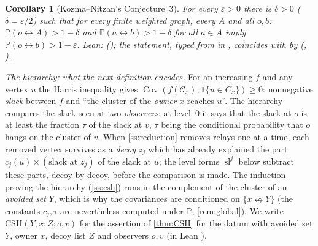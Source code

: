 \documentclass[11pt]{article}
\newtheorem{corollary}[theorem]{Corollary}
\theoremstyle{definition}
\theoremstyle{remark}
\newcommand{\PP}{\mathbb{P}}
\DeclareMathOperator{\Cov}{Cov}
\newcommand{\con}{\leftrightarrow}
\newcommand{\ncon}{\nleftrightarrow}
\newcommand{\one}{\mathbf 1}
\newcommand{\eC}{\mathcal{C}}
\newcommand{\slf}{\operatorname{sl}}
\newcommand{\CSH}{\mathrm{CSH}}
\begin{document}
\begin{corollary}[Kozma--Nitzan's Conjecture~3]\label{cor:conj3}
For every $\varepsilon>0$ there is $\delta>0$ \textup($\delta=\varepsilon/2$\textup) such that for every finite weighted graph, every $A$ and
all $o,b$: $\PP(o\con A)>1-\delta$ and $\PP(a\con b)>1-\delta$ for all $a\in A$ imply $\PP(o\con b)>1-\varepsilon$.
\emph{Lean:}  (); the statement, typed from
\citep[p.~15]{KozmaNitzan2024} in , coincides with  by
 (, ).
\end{corollary}

\emph{The hierarchy: what the next definition encodes.}  For an increasing $f$ and any vertex $u$ the Harris inequality gives
$\Cov(f(\eC_x),\one\{u\in C_x\})\ge0$: nonnegative \emph{slack} between $f$ and ``the cluster of the \emph{owner} $x$ reaches $u$''.  The
hierarchy compares the slack seen at two \emph{observers}: at level~$0$ it says that the slack at $o$ is at least the fraction $\tau$ of the
slack at $v$, $\tau$ being the conditional probability that $o$ hangs on the cluster of $v$.  When \cref{ss:reduction} removes relays one at a
time, each removed vertex survives as a \emph{decoy} $z_j$ which has already explained the part $c_j(u)\times(\text{slack at }z_j)$ of the slack
at $u$; the level forms $\slf^j$ below subtract these parts, decoy by decoy, before the comparison is made.  The induction proving the hierarchy
(\cref{ss:csh}) runs in the complement of the cluster of an \emph{avoided set} $Y$, which is why the covariances are conditioned on
$\{x\ncon Y\}$ (the constants $c_j,\tau$ are nevertheless computed under $\PP$, \cref{rem:global}).  We write $\CSH(Y;x;Z;o,v)$ for the
assertion of \cref{thm:CSH} for the datum with avoided set $Y$, owner $x$, decoy list $Z$ and observers $o,v$ (in Lean ).
\end{document}
